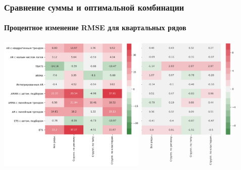 \documentclass[c, dvipsnames]{beamer}  %
\begin{document}
\begin{frame}[shrink=5]
\frametitle{Сравнение суммы и оптимальной комбинации } 
\framesubtitle{Процентное изменение RMSE для квартальных рядов}
	
	\vfil
	\hfil\hfil\includegraphics[height=6.5cm]{screenshot056}\hfil\hfil
	\includegraphics[height=6.5cm]{screenshot059}\newline
	\null\hfil\hfil{}
	\hfil\hfil{}
\end{frame}
\end{document}
